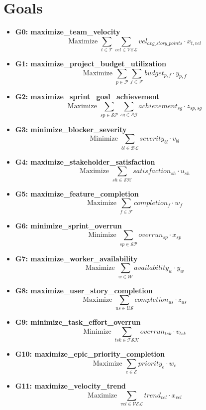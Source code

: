 \documentclass{article}
\begin{document}
\section{Goals}
\begin{itemize}
    \item \textbf{G0: maximize\_team\_velocity}
    \[
    \text{Maximize } \sum_{t \in \mathcal{T}} \sum_{vel \in \mathcal{VEL}} vel_{avg\_story\_points} \cdot x_{t,vel}
    \]
    \item \textbf{G1: maximize\_project\_budget\_utilization}
    \[
    \text{Maximize } \sum_{p \in \mathcal{P}} \sum_{f \in \mathcal{F}} budget_{p,f} \cdot y_{p,f}
    \]
    \item \textbf{G2: maximize\_sprint\_goal\_achievement}
    \[
    \text{Maximize } \sum_{sp \in \mathcal{SP}} \sum_{sg \in \mathcal{SG}} achievement_{sg} \cdot z_{sp,sg}
    \]
    \item \textbf{G3: minimize\_blocker\_severity}
    \[
    \text{Minimize } \sum_{bl \in \mathcal{BL}} severity_{bl} \cdot v_{bl}
    \]
    \item \textbf{G4: maximize\_stakeholder\_satisfaction}
    \[
    \text{Maximize } \sum_{sh \in \mathcal{SH}} satisfaction_{sh} \cdot u_{sh}
    \]
    \item \textbf{G5: maximize\_feature\_completion}
    \[
    \text{Maximize } \sum_{f \in \mathcal{F}} completion_{f} \cdot w_{f}
    \]
    \item \textbf{G6: minimize\_sprint\_overrun}
    \[
    \text{Minimize } \sum_{sp \in \mathcal{SP}} overrun_{sp} \cdot x_{sp}
    \]
    \item \textbf{G7: maximize\_worker\_availability}
    \[
    \text{Maximize } \sum_{w \in \mathcal{W}} availability_{w} \cdot y_{w}
    \]
    \item \textbf{G8: maximize\_user\_story\_completion}
    \[
    \text{Maximize } \sum_{us \in \mathcal{US}} completion_{us} \cdot z_{us}
    \]
    \item \textbf{G9: minimize\_task\_effort\_overrun}
    \[
    \text{Minimize } \sum_{tsk \in \mathcal{TSK}} overrun_{tsk} \cdot v_{tsk}
    \]
    \item \textbf{G10: maximize\_epic\_priority\_completion}
    \[
    \text{Maximize } \sum_{e \in \mathcal{E}} priority_{e} \cdot w_{e}
    \]
    \item \textbf{G11: maximize\_velocity\_trend}
    \[
    \text{Maximize } \sum_{vel \in \mathcal{VEL}} trend_{vel} \cdot x_{vel}
    \]
\end{itemize}
\end{document}
